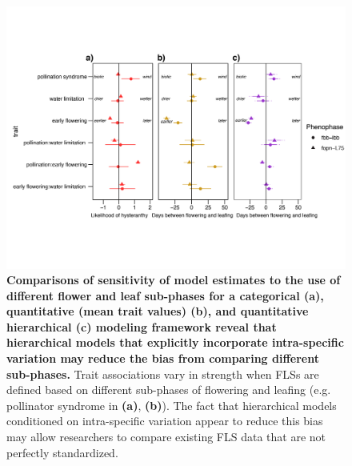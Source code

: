 \documentclass[11pt]{article}
\begin{document}
  \begin{figure}[H]
  \centering
  \includegraphics[width=\textwidth]{..//..//HFmodelplots4SUPP-01.png} 
  \caption{\textbf{Comparisons of sensitivity of model estimates to the use of different flower and leaf sub-phases for a categorical  \textbf{(a)}, quantitative (mean trait values) \textbf{(b)}, and quantitative hierarchical \textbf{(c)} modeling framework reveal that hierarchical models that explicitly incorporate intra-specific variation may reduce the bias from comparing different sub-phases.} Trait associations vary in strength when FLSs are defined based on different sub-phases of flowering and leafing (e.g. pollinator syndrome in \textbf{(a)}, \textbf{(b)}). The fact that hierarchical models conditioned on intra-specific variation appear to reduce this bias may allow researchers to compare existing FLS data that are not perfectly standardized.}
  \label{fig:sensitivity}
  \end{figure}
  
\end{document}
